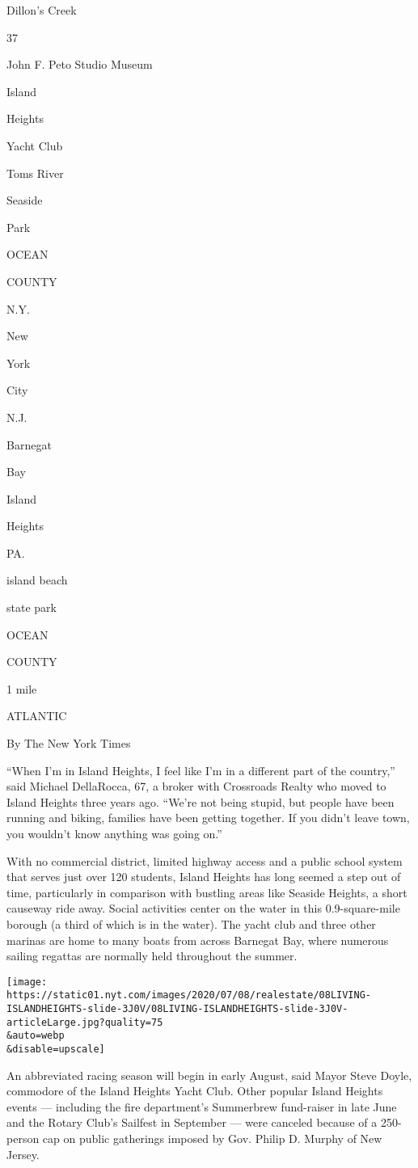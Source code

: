 Dillon's Creek

37

John F. Peto Studio Museum

Island

Heights

Yacht Club

Toms River

Seaside

Park

OCEAN

COUNTY

N.Y.

New

York

City

N.J.

Barnegat

Bay

Island

Heights

PA.

island beach

state park

OCEAN

COUNTY

1 mile

ATLANTIC

By The New York Times

``When I'm in Island Heights, I feel like I'm in a different part of the
country,'' said Michael DellaRocca, 67, a broker with Crossroads Realty
who moved to Island Heights three years ago. ``We're not being stupid,
but people have been running and biking, families have been getting
together. If you didn't leave town, you wouldn't know anything was going
on.''

With no commercial district, limited highway access and a public school
system that serves just over 120 students, Island Heights has long
seemed a step out of time, particularly in comparison with bustling
areas like Seaside Heights, a short causeway ride away. Social
activities center on the water in this 0.9-square-mile borough (a third
of which is in the water). The yacht club and three other marinas are
home to many boats from across Barnegat Bay, where numerous sailing
regattas are normally held throughout the summer.

\texttt{[image: https://static01.nyt.com/images/2020/07/08/realestate/08LIVING-ISLANDHEIGHTS-slide-3J0V/08LIVING-ISLANDHEIGHTS-slide-3J0V-articleLarge.jpg?quality=75\\\&auto=webp\\\&disable=upscale]}

An abbreviated racing season will begin in early August, said Mayor
Steve Doyle, commodore of the Island Heights Yacht Club. Other popular
Island Heights events --- including the fire department's Summerbrew
fund-raiser in late June and the Rotary Club's Sailfest in September ---
were canceled because of a 250-person cap on public gatherings imposed
by Gov. Philip D. Murphy of New Jersey.

